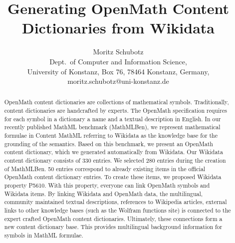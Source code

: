 \documentclass[a4paper]{article}
\title{Generating OpenMath Content Dictionaries from Wikidata}
\author{Moritz Schubotz \\
 Dept.~of Computer and Information Science,\\
 University of Konstanz, Box 76, 78464 Konstanz, Germany,\\
 moritz.schubotz@uni-konstanz.de
}
\begin{document}
\maketitle

\begin{abstract}
OpenMath content dictionaries are collections of mathematical symbols.
Traditionally, content dictionaries are handcrafted by experts.
The OpenMath specification requires for each symbol in a dictionary a name and a textual description in English.
In our recently published MathML benchmark (MathMLBen), we represent mathematical formulae in Content MathML referring to Wikidata as the knowledge base for the grounding of the semantics.
Based on this benchmark, we present an OpenMath content dictionary, which we generated automatically from Wikidata.
Our Wikidata content dictionary consists of 330 entries.
We selected 280 entries during the creation of MathMLBen.
50 entries correspond to already existing items in the official OpenMath content dictionary entries.
To create these items, we proposed Wikidata property P5610.
With this property, everyone can link OpenMath symbols and Wikidata items.
By linking Wikidata and OpenMath data, the multilingual, community maintained textual descriptions, references to Wikipedia articles, external links to other knowledge bases (such as the Wolfram functions site) is connected to the expert crafted OpenMath content dictionaries.
Ultimately, these connections form a new content dictionary base.
This provides multilingual background information for symbols in MathML formulae.
\end{abstract}
\end{document}
